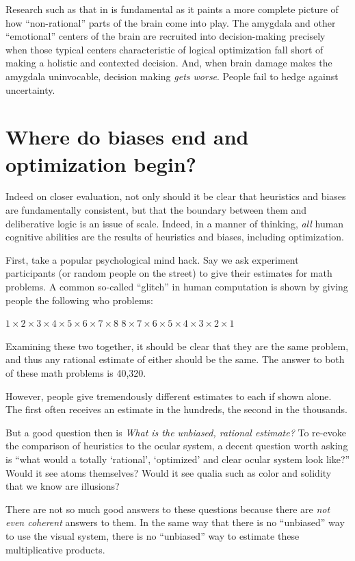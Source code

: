 \documentclass{article}
\begin{document}
Research such as that in \textcite{hsu05} is fundamental as it paints a more complete picture of how ``non-rational'' parts of the brain come into play.
The amygdala and other ``emotional'' centers of the brain are recruited into decision-making precisely when those typical centers characteristic of logical optimization fall short of making a holistic and contexted decision.
And, when brain damage makes the amygdala uninvocable, decision making \emph{gets worse}.
People fail to hedge against uncertainty.

\section{Where do biases end and optimization begin?}

Indeed on closer evaluation, not only should it be clear that heuristics and biases are fundamentally consistent, but that the boundary between them and deliberative logic is an issue of scale. Indeed, in a manner of thinking, \emph{all} human cognitive abilities are the results of heuristics and biases, including optimization.

First, take a popular psychological mind hack.
Say we ask experiment participants (or random people on the street) to give their estimates for math problems.
A common so-called ``glitch'' in human computation is shown by giving people the following who problems:

\begin{exe}
	\ex $1\times2\times3\times4\times5\times6\times7\times8$
	\ex $8\times7\times6\times5\times4\times3\times2\times1$
\end{exe}

Examining these two together, it should be clear that they are the same problem, and thus any rational estimate of either should be the same.
The answer to both of these math problems is 40,320.

However, people give tremendously different estimates to each if shown alone.
The first often receives an estimate in the hundreds, the second in the thousands.

But a good question then is \textit{What is the \emph{unbiased}, rational estimate?}
To re-evoke the comparison of heuristics to the ocular system, a decent question worth asking is ``what would a totally `rational', `optimized' and clear ocular system look like?''
Would it see atoms themselves?
Would it see qualia such as color and solidity that we know are illusions?

There are not so much good answers to these questions because there are \emph{not even coherent} answers to them.
In the same way that there is no ``unbiased'' way to use the visual system, there is no ``unbiased'' way to estimate these multiplicative products.
\end{document}
